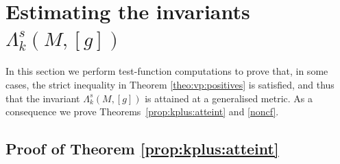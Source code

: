 \documentclass[10pt]{amsart}
\numberwithin{equation}{section}
\theoremstyle{plain}
\theoremstyle{remark}
\begin{document}
\section{Estimating the invariants $\Lambda_k^s(M,[g])$} \label{sec:fonctionstest}


In this section we perform test-function computations to prove that, in some cases, the strict inequality in Theorem \ref{theo:vp:positives} is satisfied, and thus that the invariant $\Lambda_k^s(M,[g])$ is attained at a generalised metric. As a consequence we prove Theorems~\ref{prop:kplus:atteint} and \ref{noncf}.



\subsection{Proof of Theorem \ref{prop:kplus:atteint}}
\end{document}
